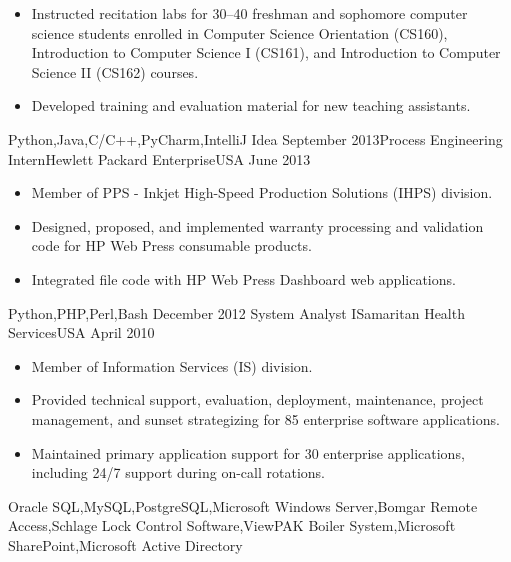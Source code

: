 \documentclass[localFont,alternative]{yaac-another-awesome-cv}
\begin{document}
\begin{experiences}
{\begin{itemize}
                        \item Instructed recitation labs for 30--40 freshman and sophomore computer science students enrolled in Computer Science Orientation (CS160), Introduction to Computer Science I (CS161), and Introduction to Computer Science II (CS162) courses.
                        \item Developed training and evaluation material for new teaching assistants.                                                                
                      \end{itemize}
                    }
    {Python,Java,C/C++,PyCharm,IntelliJ Idea}
  \emptySeparator
  \experience
    {September 2013}{Process Engineering Intern}{Hewlett Packard Enterprise}{USA}
    {June 2013}     {
                      \begin{itemize}
                        \item Member of PPS - Inkjet High-Speed Production Solutions (IHPS) division.                        
                        \item Designed, proposed, and implemented warranty processing and validation code for HP Web Press consumable products.                   
                        \item Integrated file code with HP Web Press Dashboard web applications.                                                                    
                      \end{itemize}
                    }
    {Python,PHP,Perl,Bash}
  \emptySeparator
  \experience
    {December 2012}    {System Analyst I}{Samaritan Health Services}{USA}
    {April 2010}{
                      \begin{itemize}
                        \item Member of Information Services (IS) division.
                        \item Provided technical support, evaluation, deployment, maintenance, project management, and sunset strategizing for 85 enterprise software applications.                       
                        \item Maintained primary application support for 30 enterprise applications, including 24/7 support during on-call rotations.                                                                   
                      \end{itemize}
                    }
    {Oracle SQL,MySQL,PostgreSQL,Microsoft Windows Server,Bomgar Remote Access,Schlage Lock Control Software,ViewPAK Boiler System,Microsoft SharePoint,Microsoft Active Directory}

\end{experiences}
\end{document}
